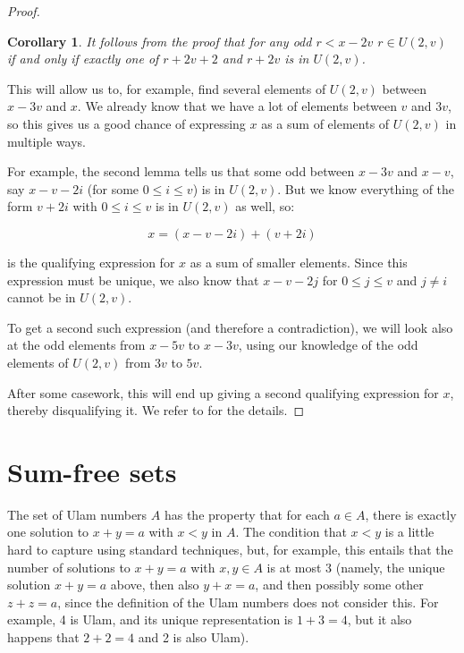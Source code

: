 \documentclass{report}
\newtheorem{corollary}{Corollary}[theorem]
\theoremstyle{remark}
\numberwithin{equation}{section}
\begin{document}
\begin{proof}
  \begin{corollary}
    It follows from the proof that for any odd $r < x-2v$
    $r \in U(2,v)$ if and only if exactly one of $r+2v+2$ and $r+2v$
    is in $U(2,v)$.
  \end{corollary}

  This will allow us to, for example, find several elements of
  $U(2,v)$ between $x-3v$ and $x$.  We already know that we have a lot
  of elements between $v$ and $3v$, so this gives us a good chance of
  expressing $x$ as a sum of elements of $U(2,v)$ in multiple ways.  

  For example, the second lemma tells us that some odd between $x-3v$
  and $x-v$, say $x-v-2i$ (for some $0 \leq i \leq v$) is in
  $U(2,v)$.  But we know everything of the form $v+2i$ with $0 \leq i
  \leq v$ is in $U(2,v)$ as well, so: 

  \[x = (x-v-2i)+(v+2i)\]

  is the qualifying expression for $x$ as a sum of smaller elements.
  Since this expression must be unique, we also know that $x-v-2j$ for
  $0 \leq j \leq v$ and $j \neq i$ cannot be in $U(2,v)$.  

  To get a second such expression (and therefore a contradiction), we
  will look also at the odd elements from $x-5v$ to $x-3v$, using our
  knowledge of the odd elements of $U(2,v)$ from $3v$ to $5v$.  

  After some casework, this will end up giving a second qualifying
  expression for $x$, thereby disqualifying it.  We refer to
  \cite{schmerl:jct1994} for the details.
  

  \end{proof}

\section{Sum-free sets}

The set of Ulam numbers $A$ has the property that for each $a \in A$,
there is exactly one solution to $x+y=a$ with $x < y$ in $A$.  The
condition that $x < y$ is a little hard to capture using standard
techniques, but, for example, this entails that the number of
solutions to $x + y = a$ with $x, y \in A$ is at most 3 (namely, the
unique solution $x+y = a$ above, then also $y+x = a$, and then
possibly some other $z+z = a$, since the definition of the Ulam
numbers does not consider this.  For example, 4 is Ulam, and its
unique representation is $1+3=4$, but it also happens that $2+2=4$ and
2 is also Ulam).
\end{document}
